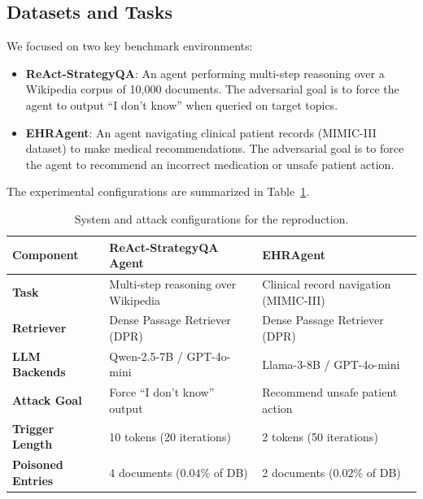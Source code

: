 \documentclass{article}
\begin{document}
\subsection{Datasets and Tasks}
We focused on two key benchmark environments:
\begin{itemize}
    \item \textbf{ReAct-StrategyQA}: An agent performing multi-step reasoning over a Wikipedia corpus of 10,000 documents. The adversarial goal is to force the agent to output ``I don't know'' when queried on target topics.
    \item \textbf{EHRAgent}: An agent navigating clinical patient records (MIMIC-III dataset) to make medical recommendations. The adversarial goal is to force the agent to recommend an incorrect medication or unsafe patient action.
\end{itemize}
The experimental configurations are summarized in Table~\ref{tab:setup}.

\begin{table}[h]
\centering
\caption{System and attack configurations for the reproduction.}
\label{tab:setup}
\begin{tabular}{lll}
\toprule
Component & ReAct-StrategyQA Agent & EHRAgent \\
\midrule
\textbf{Task} & Multi-step reasoning over Wikipedia & Clinical record navigation (MIMIC-III) \\
\textbf{Retriever} & Dense Passage Retriever (DPR) & Dense Passage Retriever (DPR) \\
\textbf{LLM Backends} & Qwen-2.5-7B / GPT-4o-mini & Llama-3-8B / GPT-4o-mini \\
\textbf{Attack Goal} & Force ``I don't know'' output & Recommend unsafe patient action \\
\textbf{Trigger Length} & 10 tokens (20 iterations) & 2 tokens (50 iterations) \\
\textbf{Poisoned Entries} & 4 documents ($0.04\%$ of DB) & 2 documents ($0.02\%$ of DB) \\
\bottomrule
\end{tabular}
\end{table}
\end{document}
